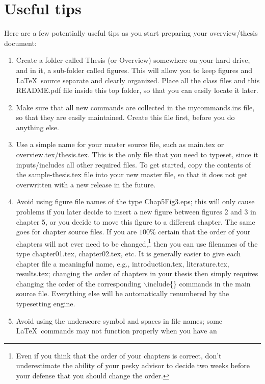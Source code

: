 \documentclass[DIV=calc, paper=letter, fontsize=11pt]{scrartcl}	 %
\newcommand{\la}[2]{\textsf{$\backslash$#1}\{#2\}}
\begin{document}
\section{Useful tips\label{sec:tips}}
Here are a few potentially useful tips as you start preparing your overview/thesis document:
\begin{enumerate}
	\item Create a folder called \textsf{Thesis} (or \textsf{Overview}) somewhere on your hard drive, and in it, a sub-folder called
	\textsf{figures}.  This will allow you to keep figures and \LaTeX\ source separate and clearly organized.  Place all the 
	class files and this README.pdf file inside this top folder, so that you can easily locate it later.
	\item Make sure that all new commands are collected in the \textsf{mycommands.ins} file, so that they are easily maintained.  Create this 
	file first, before you do anything else.
	\item Use a simple name for your master source file, such as \textsf{main.tex} or \textsf{overview.tex}/\textsf{thesis.tex}.  This is the
	only file that you need to typeset, since it inputs/includes all other required files.	  To get started, copy the contents of the \textsf{sample-thesis.tex}
	file into your new master file, so that it does not get overwritten with a new release in the future.
	\item Avoid using figure file names of the type \textsf{Chap5Fig3.eps}; this will only cause problems if you later decide to
	insert a new figure between figures 2 and 3 in chapter 5, or you decide to move this figure to a different chapter.  
	The same goes for chapter source files.  If you are $100\%$ certain
	that the order of your chapters will not ever need to be changed,\footnote{Even if you think that the 
	order of your chapters is correct, don't underestimate the ability of your pesky advisor to decide two weeks before your defense
	that you should change the order.} then you can use filenames of the type \textsf{chapter01.tex},
	\textsf{chapter02.tex}, etc.  It is generally easier to give each chapter file a meaningful name, e.g., \textsf{introduction.tex},
	\textsf{literature.tex}, \textsf{results.tex}; changing the order of chapters in your thesis then simply requires changing the 
	order of the corresponding \la{include}{} commands in the main source file.  Everything else will be automatically renumbered 
	by the typesetting engine.
	\item Avoid using the underscore symbol and spaces in file names; some \LaTeX\ commands may not function properly when you have an

\end{enumerate}
\end{document}

